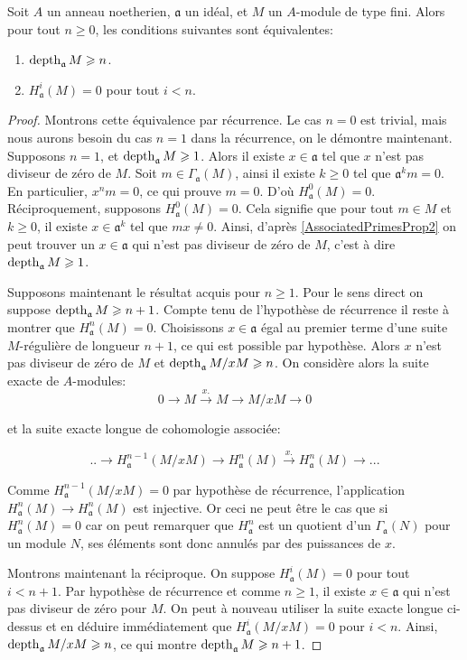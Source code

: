 \begin{prop}
Soit $A$ un anneau noetherien, $\mathfrak{a}$ un idéal, et $M$ un $A$-module de type fini. Alors pour tout $n\geq 0$, les conditions suivantes sont équivalentes:
\begin{enumerate}
\item $\operatorname{depth}_\mathfrak{a} M\geqslant n$.
\item $H_\mathfrak{a}^i(M)=0$ pour tout $i<n$.
\end{enumerate}
\end{prop}
\begin{proof}
Montrons cette équivalence par récurrence. Le cas $n=0$ est trivial, mais nous aurons besoin du cas $n=1$ dans la récurrence, on le démontre maintenant. Supposons $n=1$, et $\operatorname{depth}_\mathfrak{a} M\geqslant 1$. Alors il existe $x\in\mathfrak{a}$ tel que $x$ n'est pas diviseur de zéro de $M$. Soit $m\in \Gamma_ \mathfrak{a}(M)$, ainsi il existe $k\geq 0$ tel que $\mathfrak{a}^k m=0$. En particulier, $x^nm=0$, ce qui prouve $m=0$. D'où $H^0_\mathfrak{a}(M)=0$. Réciproquement, supposons $H^0_\mathfrak{a}(M)=0$. Cela signifie que pour tout $m\in M$ et $k\geq 0$, il existe $x\in \mathfrak{a}^k$ tel que $mx\neq 0$. Ainsi, d'après \ref{AssociatedPrimesProp2} on peut trouver un $x\in \mathfrak{a}$ qui n'est pas diviseur de zéro de $M$, c'est à dire $\operatorname{depth}_\mathfrak{a}M\geqslant 1$.

Supposons maintenant le résultat acquis pour $n\geq 1$. Pour le sens direct on suppose $\operatorname{depth}_\mathfrak{a} M\geqslant n+1$. Compte tenu de l'hypothèse de récurrence il reste à montrer que $H^n_\mathfrak{a}(M)=0$. Choisissons $x\in \mathfrak{a}$ égal au premier terme d'une suite $M$-régulière de longueur $n+1$, ce qui est possible par hypothèse. Alors $x$ n'est pas diviseur de zéro de $M$ et $\operatorname{depth}_\mathfrak{a} M/xM \geqslant n$. On considère alors la suite exacte de $A$-modules:
$$0\rightarrow M \xrightarrow{x.} M\rightarrow M/xM\rightarrow 0$$

\noindent et la suite exacte longue de cohomologie associée:

$$..\rightarrow H^{n-1}_\mathfrak{a}(M/xM) \rightarrow H^n_\mathfrak{a}(M) \xrightarrow{x.}  H^n_\mathfrak{a}(M) \rightarrow ...$$

\noindent Comme $H^{n-1}_\mathfrak{a}(M/xM)=0$ par hypothèse de récurrence, l'application $H^n_\mathfrak{a}(M) \rightarrow  H^n_\mathfrak{a}(M)$ est injective. Or ceci ne peut être le cas que si $H^n_\mathfrak{a}(M)=0$ car on peut remarquer que $H^n_\mathfrak{a}$ est un quotient d'un $\Gamma_\mathfrak{a}(N)$ pour un module $N$, ses éléments sont donc annulés par des puissances de $x$. 

Montrons maintenant la réciproque. On suppose $H^i_\mathfrak{a}(M)=0$ pour tout $i<n+1$. Par hypothèse de récurrence et comme $n\geq 1$, il existe $x\in \mathfrak{a}$ qui n'est pas diviseur de zéro pour $M$. On peut à nouveau utiliser la suite exacte longue ci-dessus et en déduire immédiatement que $H^{i}_\mathfrak{a}(M/xM)=0$ pour $i<n$. Ainsi, $\operatorname{depth}_\mathfrak{a} M/xM\geqslant n$, ce qui montre $\operatorname{depth}_\mathfrak{a} M \geqslant n+1$.
\end{proof}

